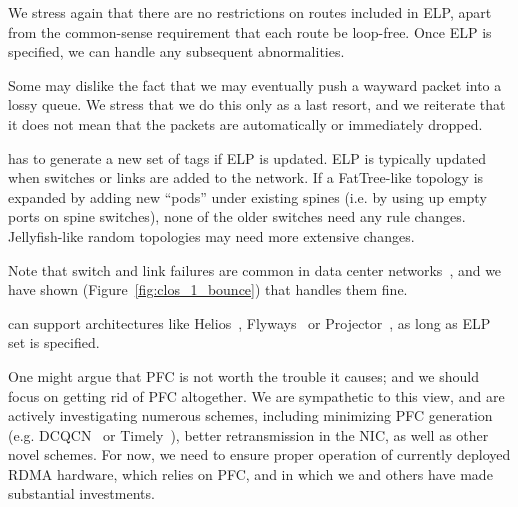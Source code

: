 We stress again that there are no restrictions on routes included in ELP, apart
from the common-sense requirement that each route be loop-free. Once ELP is
specified, we can handle any subsequent abnormalities.

 Some may dislike the fact that we may eventually push
a wayward packet into a lossy queue. We stress that we do this only as a last
resort, and we reiterate that it does not mean that the packets are
automatically or immediately dropped.

 \sysname{} has to generate a new set of tags if ELP is
updated.  ELP is typically updated when switches or links are added to the
network. If a FatTree-like topology is expanded by adding new ``pods'' under
existing spines (i.e. by using up empty ports on spine switches), none of the
older switches need any rule changes.  Jellyfish-like random topologies may need
more extensive changes.

Note that switch and link failures are common in data center
networks~\cite{netpilot}, and we have shown
(Figure~\ref{fig:clos_1_bounce}) that \sysname{} handles them fine. 

 \sysname{} can support architectures
like Helios~\cite{helios}, Flyways~\cite{flyways} or Projector~\cite{projector},
as long as ELP set is specified.

 One might argue that PFC is not worth the trouble it
causes; and we should focus on getting rid of PFC altogether.  We are
sympathetic to this view, and are actively investigating numerous schemes,
including minimizing PFC generation (e.g. DCQCN~\cite{dcqcn} or
Timely~\cite{timely}), better retransmission in the NIC, as well as other
novel schemes.  For now, we need \sysname{} to ensure proper operation of
currently deployed RDMA hardware, which relies on PFC, and in which we and
others have made substantial investments.

